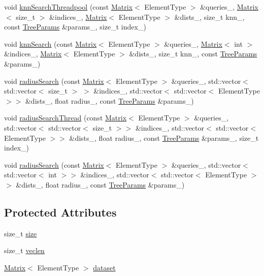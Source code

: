 \begin{DoxyCompactItemize}
\item 
void \hyperlink{classtrees_1_1_n_n_index_a059a92d41b77db12a7803e8348ae1c11}{knn\+Search\+Threadpool} (const \hyperlink{classtrees_1_1_matrix}{Matrix}$<$ Element\+Type $>$ \&queries\+\_\+, \hyperlink{classtrees_1_1_matrix}{Matrix}$<$ size\+\_\+t $>$ \&indices\+\_\+, \hyperlink{classtrees_1_1_matrix}{Matrix}$<$ Element\+Type $>$ \&dists\+\_\+, size\+\_\+t knn\+\_\+, const \hyperlink{structtrees_1_1_tree_params}{Tree\+Params} \&params\+\_\+, size\+\_\+t index\+\_\+)
\item 
void \hyperlink{classtrees_1_1_n_n_index_a4f489d7dd35c009a8e1e246dc569f8a0}{knn\+Search} (const \hyperlink{classtrees_1_1_matrix}{Matrix}$<$ Element\+Type $>$ \&queries\+\_\+, \hyperlink{classtrees_1_1_matrix}{Matrix}$<$ int $>$ \&indices\+\_\+, \hyperlink{classtrees_1_1_matrix}{Matrix}$<$ Element\+Type $>$ \&dists\+\_\+, size\+\_\+t knn\+\_\+, const \hyperlink{structtrees_1_1_tree_params}{Tree\+Params} \&params\+\_\+)
\item 
void \hyperlink{classtrees_1_1_n_n_index_ad5227bd07d877a0afee6ac9b7a94177a}{radius\+Search} (const \hyperlink{classtrees_1_1_matrix}{Matrix}$<$ Element\+Type $>$ \&queries\+\_\+, std\+::vector$<$ std\+::vector$<$ size\+\_\+t $>$ $>$ \&indices\+\_\+, std\+::vector$<$ std\+::vector$<$ Element\+Type $>$$>$ \&dists\+\_\+, float radius\+\_\+, const \hyperlink{structtrees_1_1_tree_params}{Tree\+Params} \&params\+\_\+)
\item 
void \hyperlink{classtrees_1_1_n_n_index_af19f1243b64d78dece63fc526fe8307e}{radius\+Search\+Thread} (const \hyperlink{classtrees_1_1_matrix}{Matrix}$<$ Element\+Type $>$ \&queries\+\_\+, std\+::vector$<$ std\+::vector$<$ size\+\_\+t $>$$>$ \&indices\+\_\+, std\+::vector$<$ std\+::vector$<$ Element\+Type $>$$>$ \&dists\+\_\+, float radius\+\_\+, const \hyperlink{structtrees_1_1_tree_params}{Tree\+Params} \&params\+\_\+, size\+\_\+t index\+\_\+)
\item 
void \hyperlink{classtrees_1_1_n_n_index_a2249f50af80e10630f8fb099ffd54acf}{radius\+Search} (const \hyperlink{classtrees_1_1_matrix}{Matrix}$<$ Element\+Type $>$ \&queries\+\_\+, std\+::vector$<$ std\+::vector$<$ int $>$$>$ \&indices\+\_\+, std\+::vector$<$ std\+::vector$<$ Element\+Type $>$$>$ \&dists\+\_\+, float radius\+\_\+, const \hyperlink{structtrees_1_1_tree_params}{Tree\+Params} \&params\+\_\+)
\end{DoxyCompactItemize}
\subsection*{Protected Attributes}
\begin{DoxyCompactItemize}
\item 
size\+\_\+t \hyperlink{classtrees_1_1_n_n_index_a2c14aa447b5461fb839213f092881b23}{size}
\item 
size\+\_\+t \hyperlink{classtrees_1_1_n_n_index_a3da4f85f9618451a8f7d27301fb6ac8c}{veclen}
\item 
\hyperlink{classtrees_1_1_matrix}{Matrix}$<$ Element\+Type $>$ \hyperlink{classtrees_1_1_n_n_index_a895867d67826166ea69def3488847cc6}{dataset}
\end{DoxyCompactItemize}


